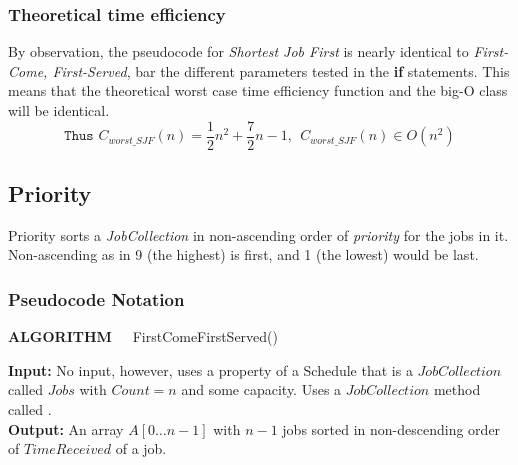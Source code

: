 \documentclass[a4paper]{article}
\begin{document}
\subsubsection{Theoretical time efficiency}
By observation, the pseudocode for \textit{Shortest Job First} is nearly identical to \textit{First-Come, First-Served}, bar the different parameters tested in the \textbf{if} statements. 
This means that the theoretical worst case time efficiency function and the big-O class will be identical. 
\[ 
   \texttt{Thus } C_{worst\_SJF}(n)= \frac{1}{2}n^2+\frac{7}{2}n - 1, 
   ~~ C_{worst\_SJF}(n) \in O(n^2)
\]

\subsection{Priority}
Priority sorts a \textit{JobCollection} in non-ascending order of \textit{priority} for the jobs in it. Non-ascending as in 9 (the highest) is first, and 1 (the lowest) would be last.

\subsubsection{Pseudocode Notation}
\vspace{-0.5cm}
\begin{small}
\begin{algorithm}
   \caption*{\textbf{ALGORITHM~~}  FirstComeFirstServed{()}}
   \textbf{Input:} No input, however, uses a property of a Schedule that is a $JobCollection$ called $Jobs$ with $Count=n$ and some capacity. Uses a $JobCollection$ method called . \\
   \textbf{Output:} An array $A[0\ldots n-1]$ with $n-1$ jobs sorted in non-descending order of $TimeReceived$ of a job.

   \begin{algorithmic}[1]
            \EndIf{}
         \EndFor{}
      \EndFor{}

   \end{algorithmic}
\end{algorithm}
\end{small}
\end{document}
